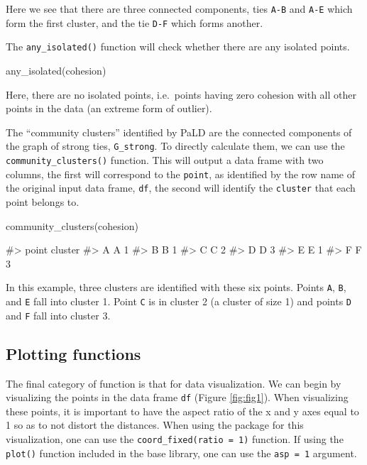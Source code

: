 Here we see that there are three connected components, ties \texttt{A-B}
and \texttt{A-E} which form the first cluster, and the tie \texttt{D-F}
which forms another.

The \texttt{any\_isolated()} function will check whether there are any
isolated points.

\begin{Schunk}
\begin{Sinput}
any_isolated(cohesion)
\end{Sinput}
\end{Schunk}

\noindent Here, there are no isolated points, i.e.~points having zero
cohesion with all other points in the data (an extreme form of outlier).

The ``community clusters'' identified by PaLD are the connected
components of the graph of strong ties, \texttt{G\_strong}. To directly
calculate them, we can use the \texttt{community\_clusters()} function.
This will output a data frame with two columns, the first will
correspond to the \texttt{point}, as identified by the row name of the
original input data frame, \texttt{df}, the second will identify the
\texttt{cluster} that each point belongs to.

\begin{Schunk}
\begin{Sinput}
community_clusters(cohesion)
\end{Sinput}
\begin{Soutput}
#>   point cluster
#> A     A       1
#> B     B       1
#> C     C       2
#> D     D       3
#> E     E       1
#> F     F       3
\end{Soutput}
\end{Schunk}

In this example, three clusters are identified with these six points.
Points \texttt{A}, \texttt{B}, and \texttt{E} fall into cluster 1. Point
\texttt{C} is in cluster 2 (a cluster of size 1) and points \texttt{D}
and \texttt{F} fall into cluster 3.

\hypertarget{plotting-functions}{%
\subsection{Plotting functions}\label{plotting-functions}}

The final category of function is that for data visualization. We can
begin by visualizing the points in the data frame \texttt{df} (Figure
\ref{fig:fig1}). When visualizing these points, it is important to have
the aspect ratio of the x and y axes equal to 1 so as to not distort the
distances. When using the  package for this
visualization, one can use the \texttt{coord\_fixed(ratio\ =\ 1)}
function. If using the \texttt{plot()} function included in the base
library, one can use the \texttt{asp\ =\ 1} argument.

